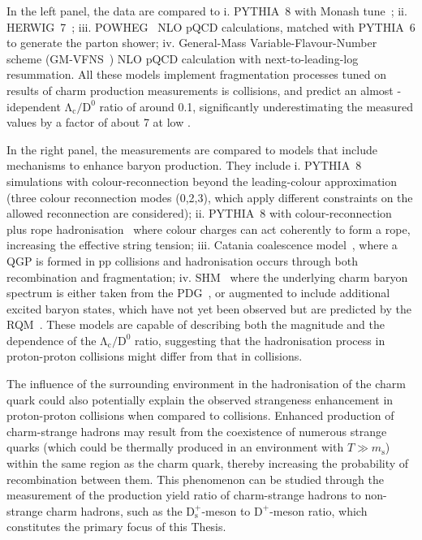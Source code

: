In the left panel, the data are compared to i. PYTHIA~8 with Monash tune~\cite{Skands:2014pea}; ii. HERWIG~7~\cite{Bellm:2015jjp}; iii. POWHEG~\cite{Frixione:2007nw} NLO pQCD calculations, matched with PYTHIA~6 to generate the parton shower; iv. General-Mass Variable-Flavour-Number scheme (GM-VFNS~\cite{Kniehl:2005mk}) NLO pQCD calculation with next-to-leading-log resummation. All these models implement fragmentation processes tuned on results of charm production measurements is \ee collisions, and predict an almost \pt-idependent $\mathrm{\Lambda_c/D^0}$ ratio of around 0.1, significantly underestimating the measured values by a factor of about 7 at low \pt.

In the right panel, the measurements are compared to models that include mechanisms to enhance baryon production. They include i. PYTHIA~8 simulations with colour-reconnection beyond the leading-colour approximation~\cite{Christiansen:2015yqa} (three colour reconnection modes (0,2,3), which apply different constraints on the allowed reconnection are considered); ii. PYTHIA~8 with colour-reconnection plus rope hadronisation~\cite{Bierlich:2014xba} where colour charges can act coherently to form a rope, increasing the effective string tension; iii. Catania coalescence model~\cite{Minissale:2020bif}, where a QGP is formed in pp collisions and hadronisation occurs through both recombination and fragmentation; iv. SHM~\cite{Braun-Munzinger:2003pwq} where the underlying charm baryon spectrum is either taken from the PDG~\cite{pdg}, or augmented to include additional excited baryon states, which have not yet been observed but are predicted by the RQM~\cite{Ebert:2011kk}. These models are capable of describing both the magnitude and the \pt dependence of the $\mathrm{\Lambda_c/D^0}$ ratio, suggesting that the hadronisation process in proton-proton collisions might differ from that in \ee collisions.

The influence of the surrounding environment in the hadronisation of the charm quark could also potentially explain the observed strangeness enhancement in proton-proton collisions when compared to \ee collisions. Enhanced production of charm-strange hadrons may result from the coexistence of numerous strange quarks (which could be thermally produced in an environment with $T \gg m_\mathrm{s}$) within the same region as the charm quark, thereby increasing the probability of recombination between them. This phenomenon can be studied through the measurement of the production yield ratio of charm-strange hadrons to non-strange charm hadrons, such as the $\mathrm{D_s^+}$-meson to $\mathrm{D^+}$-meson ratio, which constitutes the primary focus of this Thesis.